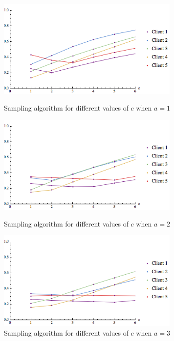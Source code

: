 \begin{figure}[t]
\centering
\begin{minipage}[h]{0.48\textwidth}
\centering
\includegraphics[width=0.8\textwidth]{images/real_sampling_a=1.png}
\caption{Sampling algorithm for different values of $c$ when $a=1$}\label{fig:real_sampling_a=1}
\end{minipage}
\hspace{0cm}
\begin{minipage}[h]{0.48\textwidth}
\centering
\includegraphics[width=0.8\textwidth]{images/real_sampling_a=2.png}
\caption{Sampling algorithm for different values of $c$ when $a=2$}\label{fig:real_sampling_a=2}
\end{minipage}
\hspace{0cm}
\centering
\begin{minipage}[h]{0.48\textwidth}
\centering
\includegraphics[width=0.8\textwidth]{images/real_sampling_a=3.png}
\caption{Sampling algorithm for different values of $c$ when $a=3$}\label{fig:real_sampling_a=3}
\end{minipage}
\vspace{-0.2in}
\end{figure}

